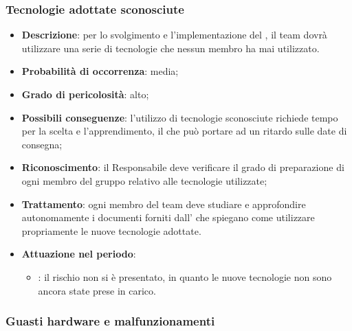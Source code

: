 \documentclass[PianoDiProgetto.tex]{subfiles}
\begin{document}
		\subsubsection{Tecnologie adottate sconosciute}
			\label{sec:tas}
		\begin{itemize}
		\item \textbf{Descrizione}: per lo svolgimento e l'implementazione del , il team dovrà utilizzare una serie di tecnologie che nessun membro ha mai utilizzato.
		\item \textbf{Probabilità di occorrenza}: media;
		\item \textbf{Grado di pericolosità}: alto;
		\item \textbf{Possibili conseguenze}: l’utilizzo di tecnologie sconosciute richiede tempo per la scelta e l’apprendimento, il che può portare ad un ritardo sulle date di consegna;
	
		\item \textbf{Riconoscimento}: il Responsabile deve verificare il grado di preparazione di ogni membro del gruppo relativo alle tecnologie utilizzate;
		\item \textbf{Trattamento}: ogni membro del team deve studiare e approfondire autonomamente i documenti forniti dall'\AMM{} che spiegano come utilizzare propriamente le nuove tecnologie adottate.
		\item \textbf{Attuazione nel periodo}: 
			\begin{itemize}
				\item \ARdoc : il rischio non si è presentato, in quanto le nuove tecnologie non sono ancora state prese in carico.
			\end{itemize}

	\end{itemize}
	
	\subsubsection{Guasti hardware e malfunzionamenti }
		\label{sec:ghs}
\end{document}
